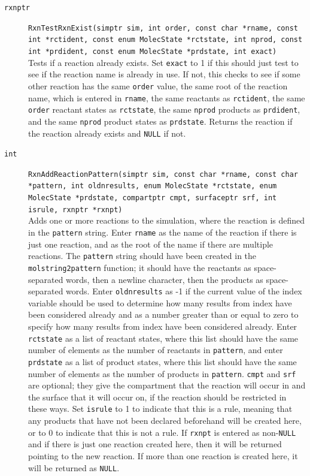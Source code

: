 \documentclass {scrbook}
\newcommand {\ttt} {\texttt}
\begin{document}
\begin{description}
\item[\ttt{rxnptr}]
\ttt{RxnTestRxnExist(simptr sim, int order, const char *rname, const int *rctident, const enum MolecState *rctstate, int nprod, const int *prdident, const enum MolecState *prdstate, int exact)} \\
Tests if a reaction already exists. Set \ttt{exact} to 1 if this should just test to see if the reaction name is already in use. If not, this checks to see if some other reaction has the same \ttt{order} value, the same root of the reaction name, which is entered in \ttt{rname}, the same reactants as \ttt{rctident}, the same \ttt{order} reactant states as \ttt{rctstate}, the same \ttt{nprod} products as \ttt{prdident}, and the same \ttt{nprod} product states as \ttt{prdstate}. Returns the reaction if the reaction already exists and \ttt{NULL} if not.

\item[\ttt{int}]
\ttt{RxnAddReactionPattern(simptr sim, const char *rname, const char *pattern, int oldnresults, enum MolecState *rctstate, enum MolecState *prdstate, compartptr cmpt, surfaceptr srf, int isrule, rxnptr *rxnpt)} \\
Adds one or more reactions to the simulation, where the reaction is defined in the \ttt{pattern} string. Enter \ttt{rname} as the name of the reaction if there is just one reaction, and as the root of the name if there are multiple reactions. The \ttt{pattern} string should have been created in the \ttt{molstring2pattern} function; it should have the reactants as space-separated words, then a newline character, then the products as space-separated words. Enter \ttt{oldnresults} as -1 if the current value of the index variable should be used to determine how many results from index have been considered already and as a number greater than or equal to zero to specify how many results from index have been considered already. Enter \ttt{rctstate} as a list of reactant states, where this list should have the same number of elements as the number of reactants in \ttt{pattern}, and enter \ttt{prdstate} as a list of product states, where this list should have the same number of elements as the number of products in \ttt{pattern}. \ttt{cmpt} and \ttt{srf} are optional; they give the compartment that the reaction will occur in and the surface that it will occur on, if the reaction should be restricted in these ways. Set \ttt{isrule} to 1 to indicate that this is a rule, meaning that any products that have not been declared beforehand will be created here, or to 0 to indicate that this is not a rule. If \ttt{rxnpt} is entered as non-\ttt{NULL} and if there is just one reaction created here, then it will be returned pointing to the new reaction. If more than one reaction is created here, it will be returned as \ttt{NULL}.


\end{description}
\end{document}
